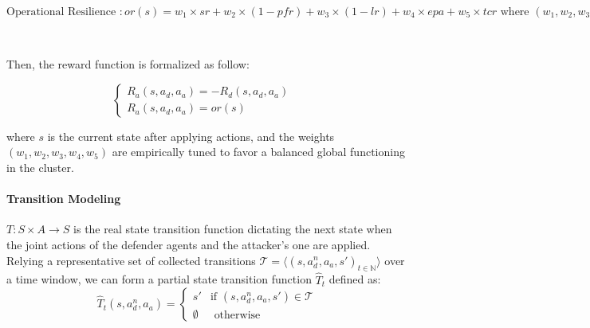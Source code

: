 \vspace{0.3cm}

$\text{Operational Resilience }: or(s) = w_1 \times sr
  \allowbreak + w_2 \times (1 - pfr)
  \allowbreak + w_3 \times (1 - lr)
  \allowbreak + w_4 \times epa
  \allowbreak + w_5 \times tcr
  \text{ where } (w_1, w_2, w_3, w_4, w_5) \text{ are relative weights.}$

\

Then, the reward function is formalized as follow:

$$
  \begin{cases}
    R_a(s, a_d, a_a) = -R_d(s, a_d, a_a) & \\
    R_a(s, a_d, a_a) = or(s)
  \end{cases}
$$

where $s$ is the current state after applying actions, and the weights $(w_1, w_2, w_3, w_4, w_5)$ are empirically tuned to favor a balanced global functioning in the cluster.


\noindent \paragraph{\textbf{Transition Modeling}} $T: S \times A \rightarrow S$ is the real state transition function dictating the next state when the joint actions of the defender agents and the attacker's one are applied. Relying a representative set of collected transitions $\mathcal{T} = \langle(s, a_d^n, a_a, s')_{t\in \mathbb{N}}\rangle$ over a time window, we can form a partial state transition function $\hat{T}_t$ defined as:
%
$$
  \hat{T}_t(s, a_d^n, a_a) =
  \begin{cases}
    s'        & \text{if } (s, a_d^n, a_a, s') \in \mathcal{T} \\
    \emptyset & \text{ otherwise}
  \end{cases}
$$

